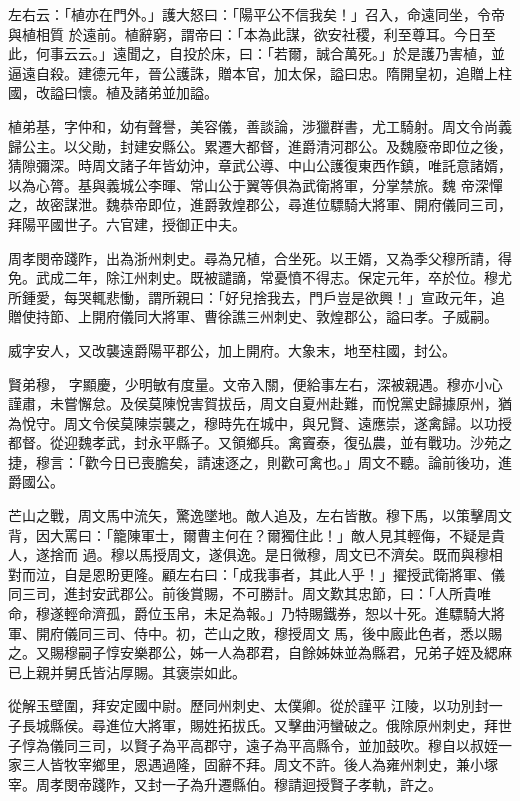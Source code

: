 \begin{pinyinscope}
 左右云：「植亦在門外。」護大怒曰：「陽平公不信我矣！」召入，命遠同坐，令帝與植相質
 於遠前。植辭窮，謂帝曰：「本為此謀，欲安社稷，利至尊耳。今日至此，何事云云。」遠聞之，自投於床，曰：「若爾，誠合萬死。」於是護乃害植，並逼遠自殺。建德元年，晉公護誅，贈本官，加太保，謚曰忠。隋開皇初，追贈上柱國，改謚曰懷。植及諸弟並加謚。



 植弟基，字仲和，幼有聲譽，美容儀，善談論，涉獵群書，尤工騎射。周文令尚義歸公主。以父勛，封建安縣公。累遷大都督，進爵清河郡公。及魏廢帝即位之後，猜隙彌深。時周文諸子年皆幼沖，章武公導、中山公護復東西作鎮，唯託意諸婿，以為心膂。基與義城公李暉、常山公于翼等俱為武衛將軍，分掌禁旅。魏
 帝深憚之，故密謀泄。魏恭帝即位，進爵敦煌郡公，尋進位驃騎大將軍、開府儀同三司，拜陽平國世子。六官建，授御正中夫。



 周孝閔帝踐阼，出為浙州刺史。尋為兄植，合坐死。以王婿，又為季父穆所請，得免。武成二年，除江州刺史。既被譴謫，常憂憤不得志。保定元年，卒於位。穆尤所鍾愛，每哭輒悲慟，謂所親曰：「好兒捨我去，門戶豈是欲興！」宣政元年，追贈使持節、上開府儀同大將軍、曹徐譙三州刺史、敦煌郡公，謚曰孝。子威嗣。



 威字安人，又改襲遠爵陽平郡公，加上開府。大象末，地至柱國，封公。



 賢弟穆，
 字顯慶，少明敏有度量。文帝入關，便給事左右，深被親遇。穆亦小心謹肅，未嘗懈怠。及侯莫陳悅害賀拔岳，周文自夏州赴難，而悅黨史歸據原州，猶為悅守。周文令侯莫陳崇襲之，穆時先在城中，與兄賢、遠應崇，遂禽歸。以功授都督。從迎魏孝武，封永平縣子。又領鄉兵。禽竇泰，復弘農，並有戰功。沙苑之捷，穆言：「歡今日已喪膽矣，請速逐之，則歡可禽也。」周文不聽。論前後功，進爵國公。



 芒山之戰，周文馬中流矢，驚逸墜地。敵人追及，左右皆散。穆下馬，以策擊周文背，因大罵曰：「籠陳軍士，爾曹主何在？爾獨住此！」敵人見其輕侮，不疑是貴人，遂捨而
 過。穆以馬授周文，遂俱逸。是日微穆，周文已不濟矣。既而與穆相對而泣，自是恩盼更隆。顧左右曰：「成我事者，其此人乎！」擢授武衛將軍、儀同三司，進封安武郡公。前後賞賜，不可勝計。周文歎其忠節，曰：「人所貴唯命，穆遂輕命濟孤，爵位玉帛，未足為報。」乃特賜鐵券，恕以十死。進驃騎大將軍、開府儀同三司、侍中。初，芒山之敗，穆授周文馬，後中廄此色者，悉以賜之。又賜穆嗣子惇安樂郡公，姊一人為郡君，自餘姊妹並為縣君，兄弟子姪及緦麻已上親并舅氏皆沾厚賜。其褒崇如此。



 從解玉壁圍，拜安定國中尉。歷同州刺史、太僕卿。從於謹平
 江陵，以功別封一子長城縣侯。尋進位大將軍，賜姓拓拔氏。又擊曲沔蠻破之。俄除原州刺史，拜世子惇為儀同三司，以賢子為平高郡守，遠子為平高縣令，並加鼓吹。穆自以叔姪一家三人皆牧宰鄉里，恩遇過隆，固辭不拜。周文不許。後人為雍州刺史，兼小塚宰。周孝閔帝踐阼，又封一子為升遷縣伯。穆請迴授賢子孝軌，許之。




\end{pinyinscope}

